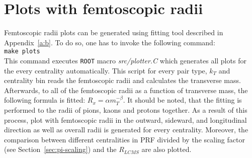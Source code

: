   \section{Plots with femtoscopic radii}
    Femtoscopic radii plots can be generated using fitting tool described in Appendix~\ref{a:b}.
    To do so, one has to invoke the following command:\\
    \verb|make plots|\\
    This command executes \verb|ROOT| macro \textit{src/plotter.C} which generates all plots for the every centrality automatically.
    This script for every pair type, $k_T$ and centrality bin reads the femtoscopic radii and calculates the transverse mass.
    Afterwards, to all of the femtoscopic radii as a function of transverse mass, the following formula is fitted: $R_x=\alpha m_T^{-\beta}$.
    It should be noted, that the fitting is performed to the radii of pions, kaons and protons together.
    As a result of this process, plot with femtoscopic radii in the outward, sideward, and longitudinal direction as well as overall radii is generated for every centrality.
    Moreover, the comparison between different centralities in PRF divided by the scaling factor (see Section~\ref{sec:pi-scaling}) and the $R_{LCMS}$ are also plotted.

